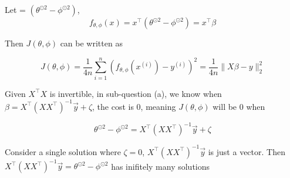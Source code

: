 \begin{answer}

Let \beta = $(\theta^{\odot 2} -\phi^{\odot 2})$,
\begin{equation}
	f_{\theta,\phi}(x)=x^\top (\theta^{\odot 2} -\phi^{\odot 2}) = x^\top \beta
\end{equation}

Then $J(\theta,\phi)$ can be written as 

\begin{equation}
    J(\theta,\phi)=\frac{1}{4n}\sum_{i=1}^{n}(f_{\theta,\phi}(x^{(i)})-y^{(i)})^2 = \frac{1}{4n} \| X \beta - y \|_2^2
\end{equation}

Given $X^\top X$ is invertible, in sub-question (a), we know when $\beta=X^\top (XX^\top)^{-1}\vec{y}+\zeta$, the cost is 0, meaning $J(\theta, \phi)$ will be 0 when 

\begin{equation}
    \theta^{\odot 2} -\phi^{\odot 2} = X^\top (XX^\top)^{-1}\vec{y}+\zeta
\end{equation}

Consider a single solution where $\zeta = 0$, $X^\top (XX^\top)^{-1}\vec{y}$ is just a vector. Then $ X^\top (XX^\top)^{-1}\vec{y} = \theta^{\odot 2} -\phi^{\odot 2}$ has inifitely many solutions 
\end{answer}
